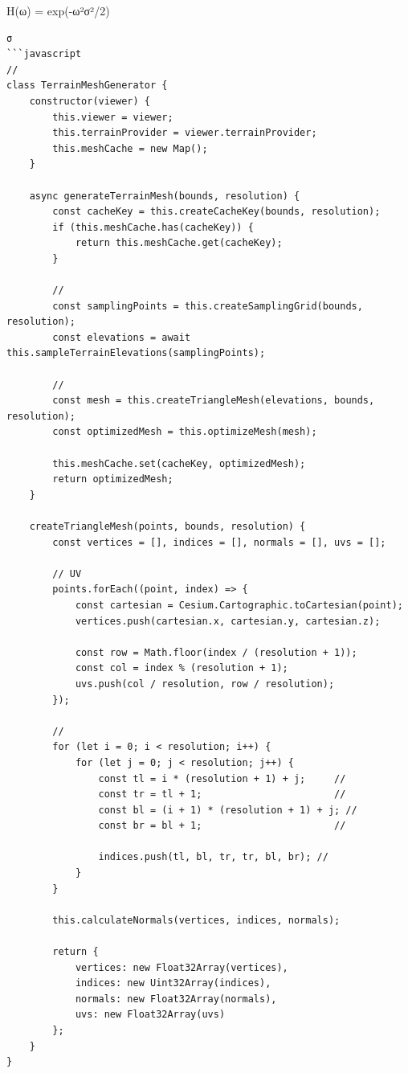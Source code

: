 H(ω) = exp(-ω²σ²/2)

\begin{verbatim}
σ
```javascript
// 
class TerrainMeshGenerator {
    constructor(viewer) {
        this.viewer = viewer;
        this.terrainProvider = viewer.terrainProvider;
        this.meshCache = new Map();
    }
    
    async generateTerrainMesh(bounds, resolution) {
        const cacheKey = this.createCacheKey(bounds, resolution);
        if (this.meshCache.has(cacheKey)) {
            return this.meshCache.get(cacheKey);
        }
        
        // 
        const samplingPoints = this.createSamplingGrid(bounds, resolution);
        const elevations = await this.sampleTerrainElevations(samplingPoints);
        
        // 
        const mesh = this.createTriangleMesh(elevations, bounds, resolution);
        const optimizedMesh = this.optimizeMesh(mesh);
        
        this.meshCache.set(cacheKey, optimizedMesh);
        return optimizedMesh;
    }
    
    createTriangleMesh(points, bounds, resolution) {
        const vertices = [], indices = [], normals = [], uvs = [];
        
        // UV
        points.forEach((point, index) => {
            const cartesian = Cesium.Cartographic.toCartesian(point);
            vertices.push(cartesian.x, cartesian.y, cartesian.z);
            
            const row = Math.floor(index / (resolution + 1));
            const col = index % (resolution + 1);
            uvs.push(col / resolution, row / resolution);
        });
        
        // 
        for (let i = 0; i < resolution; i++) {
            for (let j = 0; j < resolution; j++) {
                const tl = i * (resolution + 1) + j;     // 
                const tr = tl + 1;                       //   
                const bl = (i + 1) * (resolution + 1) + j; // 
                const br = bl + 1;                       // 
                
                indices.push(tl, bl, tr, tr, bl, br); // 
            }
        }
        
        this.calculateNormals(vertices, indices, normals);
        
        return {
            vertices: new Float32Array(vertices),
            indices: new Uint32Array(indices),
            normals: new Float32Array(normals),
            uvs: new Float32Array(uvs)
        };
    }
}
\end{verbatim}

